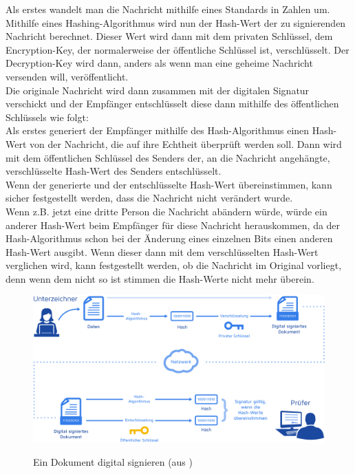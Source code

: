 \documentclass[12pt,a4paper]{scrartcl}
\begin{document}
Als erstes wandelt man die Nachricht mithilfe eines Standards in Zahlen um. Mithilfe eines Hashing-Algorithmus wird nun der Hash-Wert der zu signierenden Nachricht berechnet. Dieser Wert wird dann mit dem privaten Schlüssel, dem Encryption-Key, der normalerweise der öffentliche Schlüssel ist, verschlüsselt. %
	Der Decryption-Key wird dann, anders als wenn man eine geheime Nachricht versenden will, veröffentlicht.\\
	Die originale Nachricht wird dann zusammen mit der digitalen Signatur verschickt und der Empfänger entschlüsselt diese dann mithilfe des öffentlichen Schlüssels wie folgt:\\
	Als erstes generiert der Empfänger mithilfe des Hash-Algorithmus einen Hash-Wert von der Nachricht, die auf ihre Echtheit überprüft werden soll. Dann wird mit dem öffentlichen Schlüssel des Senders der, an die Nachricht angehängte, verschlüsselte Hash-Wert des Senders entschlüsselt. \\
Wenn der generierte und der entschlüsselte Hash-Wert übereinstimmen, kann sicher festgestellt werden, dass die Nachricht nicht verändert wurde. \\
Wenn z.B. jetzt eine dritte Person die Nachricht abändern würde, würde ein anderer Hash-Wert beim Empfänger für diese Nachricht herauskommen, da der Hash-Algorithmus schon bei der Änderung eines einzelnen Bits einen anderen Hash-Wert ausgibt. Wenn dieser dann mit dem verschlüsselten Hash-Wert verglichen wird, kann festgestellt werden, ob die Nachricht im Original vorliegt, denn wenn dem nicht so ist stimmen die Hash-Werte nicht mehr überein.\\



\begin{figure}
\includegraphics[scale=0.45]{Dokument_digitale_Signatur} \\
\caption{Ein Dokument digital signieren (aus \cite{digitalsignature})}
\label{fig:figure3}
\end{figure}
\end{document}
